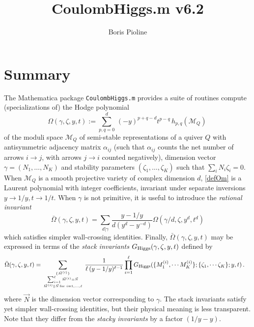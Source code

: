 \documentclass[12pt]{JHEP3}
\title{CoulombHiggs.m v6.2}
\author{Boris Pioline}
\newcommand{\be}{\begin{equation}}
\newcommand{\ee}{\end{equation}}
\newcommand\bOm{\bar\Omega}
\newcommand{\cM}{\mathcal{M}}
\newcommand{\gR}{G_{\rm Higgs}}
\begin{document}
\maketitle

\baselineskip 15pt

\tableofcontents

\medskip

\section{Summary}

The  {\sc Mathematica} package {\tt CoulombHiggs.m} provides a suite of routines compute (specializations of) the Hodge polynomial 
\be
\label{defOm}
\Omega(\gamma,\zeta,y,t) := 
\sum_{p,q=0}^{d}\, (-y)^{p+q-d} t^{p-q}\, h_{p,q}(\cM_Q)\, 
\ee
of the moduli space $\cM_Q$ of semi-stable representations of a quiver $Q$ with antisymmetric
adjacency matrix $\alpha_{ij}$ (such that $\alpha_{ij}$ counts the net number of arrows $i\to j$, with
arrows $j\to i$ counted negatively),  dimension vector $\gamma=(N_1,\dots, N_K)$ and stability parameters $(\zeta_1,\dots, \zeta_K)$ such that $\sum_i N_i \zeta_i=0$. When $\cM_Q$ is 
a smooth projective variety of complex dimension $d$, \eqref{defOm} is a Laurent polynomial  with integer coefficients, invariant under separate inversions $y\to 1/y, t\to 1/t$. When $\gamma$ is not primitive, it is useful to introduce the {\it rational invariant}
\be
\label{defbOm}
\bOm(\gamma,\zeta,y,t)=\sum_{d|\gamma} \frac{y-1/y}{d(y^d-y^{-d})} \Omega(\gamma/d,\zeta,y^d,t^d)\ee 
which satisfies simpler wall-crossing identities. Finally, $\bOm(\gamma,\zeta,y,t)$ may be expressed 
in terms of the {\it stack invariants} $G_{\rm Higgs}(\gamma,\zeta,y,t)$ defined by \cite[(4.1)]{Manschot:2013sya}
\be
\label{eq:inversestackinv}
\begin{split}
\bOm(\gamma,\zeta,y,t) 
  =& %
  \sum_{\{\vec M^{(i)}\} \atop {
  \sum_{i=1}^\ell \vec M^{(i)}=\vec N \atop  \vec M^{(i)}\parallel \vec N
  \,\mathrm{for}\,\, i=1,\dots,\ell}}
\frac{1}{\ell\,(y-1/y)^{\ell-1}}  
\prod_{i=1}^\ell 
\gR(\{ M^{(i)}_1, \cdots M^{(i)}_K \};
\{\zeta_1, \cdots \zeta_K\};y,t)
\, .  
\end{split}
\ee
where $\vec N$ is the dimension vector corresponding to $\gamma$. The stack invariants 
satisfy yet simpler wall-crossing identities, but their physical meaning is less transparent.
Note that they differ from the {\it stacky invariants} by a factor $(1/y-y)$.
\end{document}
